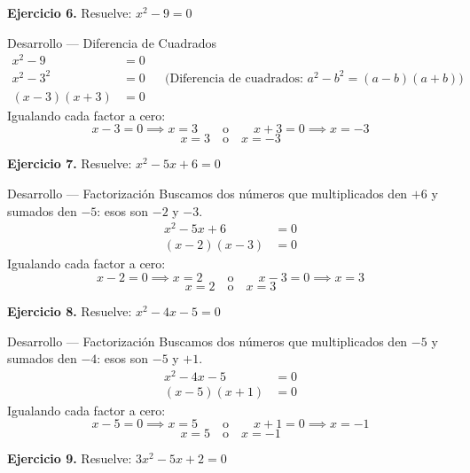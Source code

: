 \documentclass[letterpaper, 12pt]{article}
\begin{document}
\textbf{Ejercicio 6.} Resuelve: $x^2 - 9 = 0$

\begin{solucionbox}{Desarrollo — Diferencia de Cuadrados}
\begin{align*}
    x^2 - 9 &= 0 \\
    x^2 - 3^2 &= 0 && \text{(Diferencia de cuadrados: } a^2 - b^2 = (a-b)(a+b)\text{)} \\
    (x - 3)(x + 3) &= 0
\end{align*}
Igualando cada factor a cero:
\[
    x - 3 = 0 \implies x = 3 \qquad \text{o} \qquad x + 3 = 0 \implies x = -3
\]
\[\boxed{x = 3 \quad \text{o} \quad x = -3}\]
\end{solucionbox}

\vspace{0.4cm}

\textbf{Ejercicio 7.} Resuelve: $x^2 - 5x + 6 = 0$

\begin{solucionbox}{Desarrollo — Factorización}
Buscamos dos números que multiplicados den $+6$ y sumados den $-5$: esos son $-2$ y $-3$.
\begin{align*}
    x^2 - 5x + 6 &= 0 \\
    (x - 2)(x - 3) &= 0
\end{align*}
Igualando cada factor a cero:
\[
    x - 2 = 0 \implies x = 2 \qquad \text{o} \qquad x - 3 = 0 \implies x = 3
\]
\[\boxed{x = 2 \quad \text{o} \quad x = 3}\]
\end{solucionbox}

\vspace{0.4cm}

\textbf{Ejercicio 8.} Resuelve: $x^2 - 4x - 5 = 0$

\begin{solucionbox}{Desarrollo — Factorización}
Buscamos dos números que multiplicados den $-5$ y sumados den $-4$: esos son $-5$ y $+1$.
\begin{align*}
    x^2 - 4x - 5 &= 0 \\
    (x - 5)(x + 1) &= 0
\end{align*}
Igualando cada factor a cero:
\[
    x - 5 = 0 \implies x = 5 \qquad \text{o} \qquad x + 1 = 0 \implies x = -1
\]
\[\boxed{x = 5 \quad \text{o} \quad x = -1}\]
\end{solucionbox}

\vspace{0.4cm}

\textbf{Ejercicio 9.} Resuelve: $3x^2 - 5x + 2 = 0$
\end{document}
